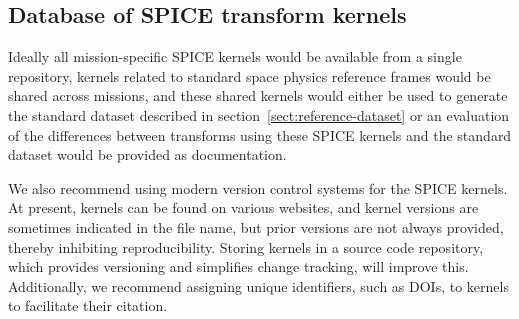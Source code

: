 \documentclass[draft]{agujournal2019}
\begin{document}


\subsection{Database of SPICE transform kernels}




Ideally all mission-specific SPICE kernels would be available from a single repository, kernels related to standard space physics reference frames would be shared across missions, and these shared kernels would either be used to generate the standard dataset described in section~\ref{sect:reference-dataset} or an evaluation of the differences between transforms using these SPICE kernels and the standard dataset would be provided as documentation.

We also recommend using modern version control systems for the SPICE kernels. At present, kernels can be found on various websites, and kernel versions are sometimes indicated in the file name, but prior versions are not always provided, thereby inhibiting reproducibility. Storing kernels in a source code repository, which provides versioning and simplifies change tracking, will improve this. Additionally, we recommend assigning unique identifiers, such as DOIs, to kernels to facilitate their citation.




\end{document}
